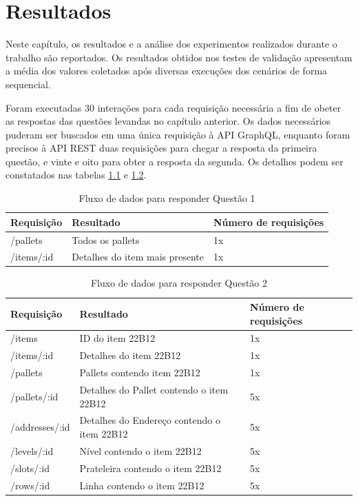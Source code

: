 \chapter{Resultados}

Neste capítulo, os resultados e a análise dos experimentos realizados durante o trabalho são reportados. Os resultados obtidos nos testes de validação apresentam a média dos valores coletados após diversas execuções dos cenários de forma sequencial.

Foram executadas 30 interações para cada requisição necessária a fim de obeter as respostas das questões levandas no capítulo anterior. Os dados necessários puderam ser buscados em uma única requisição à API GraphQL, enquanto foram precisos à API REST duas requisições para chegar a resposta da primeira questão, e vinte e oito para obter a resposta da segunda. Os detalhes podem ser constatados nas tabelas \ref{tab:request-table1} e \ref{tab:request-table2}.

\begin{table}[htbp]
    \centering
    \begin{tabular}{| l | l | l |}
        \hline
        \textbf{Requisição} & \textbf{Resultado} & \textbf{Número de requisições} \\ \hline
        /pallets & Todos os pallets & 1x \\ \hline
        /items/:id & Detalhes do item mais presente & 1x \\ \hline
    \end{tabular}
    \caption{Fluxo de dados para responder Questão 1} 
    \label{tab:request-table1}
\end{table}

\begin{table}[htbp]
    \centering
    \begin{tabular}{| l | l | l |}
        \hline
        \textbf{Requisição} & \textbf{Resultado} & \textbf{Número de requisições} \\ \hline
        /items & ID do item 22B12 & 1x \\ \hline
        /items/:id & Detalhes do item 22B12 & 1x \\ \hline
        /pallets & Pallets contendo item 22B12 & 1x \\ \hline
        /pallets/:id & Detalhes do Pallet contendo o item 22B12 & 5x \\ \hline
        /addresses/:id & Detalhes do Endereço contendo o item 22B12 & 5x \\ \hline
        /levels/:id & Nível contendo o item 22B12 & 5x \\ \hline
        /slots/:id & Prateleira contendo o item 22B12 & 5x  \\ \hline
        /rows/:id & Linha contendo o item 22B12 & 5x \\ \hline
    \end{tabular}
    \caption{Fluxo de dados para responder Questão 2} 
    \label{tab:request-table2}
\end{table}

